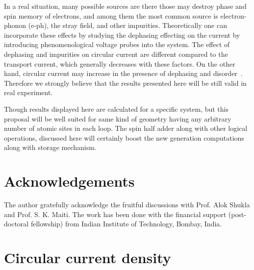 \documentclass[prb,aps,twocolumn,amsmath,amssymb,floatfix,superscriptaddress]{revtex4}
\begin{document}
In a real situation, many possible sources are there those may destroy
phase and spin memory of electrons, and among them the most common source is electron-phonon
(e-ph), the stray field, and other impurities. Theoretically one can incorporate these effects
by studying the dephasing effecting on the current by introducing phenomenological voltage
probes into the system. The effect of dephasing and impurities on circular current are
different compared to the transport current, which generally decreases with these factors.
On the other hand, circular current may increase in the presence of dephasing
and disorder~\cite{ref14}. Therefore we strongly believe that the results presented here
will be still valid in real experiment.

Though results displayed here are calculated for a specific system, but this proposal will be well
suited for same kind of geometry having any arbitrary number of atomic sites in each loop. The spin
half adder along with other logical operations, discussed here will certainly boost the new
generation computations along with storage mechanism.

\section{Acknowledgements}

The author gratefully acknowledge the fruitful discussions with Prof. Alok Shukla and
Prof. S. K. Maiti. The work has been done with the financial support (post-doctoral
fellowship) from Indian Institute of Technology, Bombay, India.

\appendix

\section{Circular current density}
\label{aa}
\end{document}
